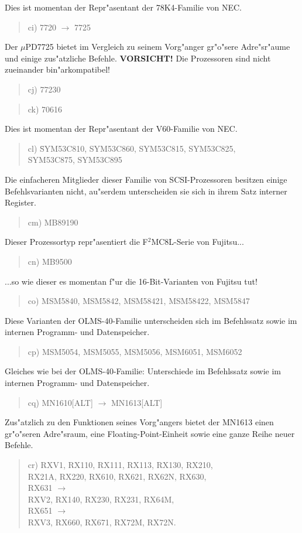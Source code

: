 \documentclass[12pt,a4paper,twoside]{report}
\begin{document}
Dies ist momentan der Repr"asentant der 78K4-Familie von NEC.
\begin{quote}
ci) 7720 $\rightarrow$ 7725
\end{quote}
Der $\mu$PD7725 bietet im Vergleich zu seinem Vorg"anger gr"o"sere
Adre"sr"aume und einige zus"atzliche Befehle. {\bf VORSICHT!}  Die
Prozessoren sind nicht zueinander bin"arkompatibel!
\begin{quote}
cj) 77230
\end{quote}
\begin{quote}
ck) 70616
\end{quote}
Dies ist momentan der Repr"asentant der V60-Familie von NEC.
\begin{quote}
\begin{tabbing}
cl) \= SYM53C810, SYM53C860, SYM53C815, SYM53C825, \\
    \> SYM53C875, SYM53C895
\end{tabbing}
\end{quote}
Die einfacheren Mitglieder dieser Familie von SCSI-Prozessoren besitzen
einige Befehlsvarianten nicht, au"serdem unterscheiden sie sich in ihrem
Satz interner Register.
\begin{quote}
cm) MB89190
\end{quote}
Dieser Prozessortyp repr"asentiert die F$^{2}$MC8L-Serie von Fujitsu...
\begin{quote}
cn) MB9500
\end{quote}
...so wie dieser es momentan f"ur die 16-Bit-Varianten von Fujitsu tut!
\begin{quote}
co) MSM5840, MSM5842, MSM58421, MSM58422, MSM5847
\end{quote}
Diese Varianten der OLMS-40-Familie unterscheiden sich im
Befehlssatz sowie im internen Programm- und Datenspeicher.
\begin{quote}
cp) MSM5054, MSM5055, MSM5056, MSM6051, MSM6052
\end{quote}
Gleiches wie bei der OLMS-40-Familie: Unterschiede im
Befehlssatz sowie im internen Programm- und Datenspeicher.
\begin{quote}
cq) MN1610[ALT] $\rightarrow$ MN1613[ALT]
\end{quote}
Zus"atzlich zu den Funktionen seines Vorg"angers bietet der
MN1613 einen gr"o"seren Adre"sraum, eine Floating-Point-Einheit
sowie eine ganze Reihe neuer Befehle.
\begin{quote}
cr) RXV1, RX110, RX111, RX113, RX130, RX210,\\
    RX21A, RX220, RX610, RX621, RX62N, RX630,\\
    RX631 $\longrightarrow$ \\
    RXV2, RX140, RX230, RX231, RX64M,\\
    RX651 $\longrightarrow$ \\
    RXV3, RX660, RX671, RX72M, RX72N.\\
\end{quote}
\end{document}
